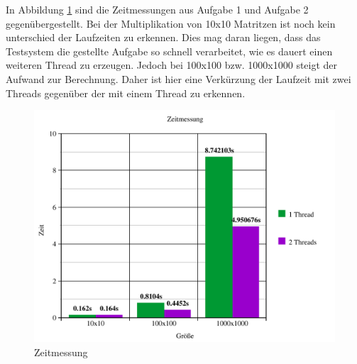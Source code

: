 \documentclass[a4paper]{article}
\begin{document}
In Abbildung \ref{graph} sind die Zeitmessungen aus Aufgabe 1 und Aufgabe 2 gegenübergestellt.
Bei der Multiplikation von 10x10 Matritzen ist noch kein unterschied der Laufzeiten zu erkennen.
Dies mag daran liegen, dass das Testsystem die gestellte Aufgabe so schnell verarbeitet, wie es
dauert einen weiteren Thread zu erzeugen.
Jedoch bei 100x100 bzw. 1000x1000 steigt der Aufwand zur Berechnung. Daher ist hier eine Verkürzung der Laufzeit mit zwei Threads gegenüber der mit einem Thread zu erkennen.

\begin{figure}
\includegraphics[scale=0.8]{graph.pdf}
\caption{Zeitmessung}
\label{graph}
\end{figure}
\end{document}
